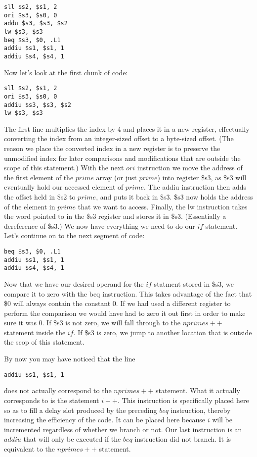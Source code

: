 \documentclass[11pt]{article}
\begin{document}
\begin{verbatim}
sll $s2, $s1, 2
ori $s3, $s0, 0
addu $s3, $s3, $s2
lw $s3, $s3
beq $s3, $0, .L1
addiu $s1, $s1, 1
addiu $s4, $s4, 1
\end{verbatim}

Now let's look at the first chunk of code:

\begin{verbatim}
sll $s2, $s1, 2
ori $s3, $s0, 0
addiu $s3, $s3, $s2
lw $s3, $s3
\end{verbatim}

The first line multiplies the index by 4 and places it in a new register, effectually converting the index from an integer-sized offset to a byte-sized offset. (The reason we place the converted index in a new register is to preserve the unmodified index for later comparisons and modifications that are outside the scope of this statement.) With the next $ori$ instruction we move the address of the first element of the $prime$ array (or just $prime$) into register \$s3, as \$s3 will eventually hold our accessed element of $prime$. The addiu instruction then adds the offset held in \$s2 to $prime$, and puts it back in \$s3. \$s3 now holds the address of the element in $prime$ that we want to access. Finally, the lw instruction takes the word pointed to in the \$s3 register and stores it in \$s3. (Essentially a dereference of \$s3.) We now have everything we need to do our $if$ statement. Let's continue on to the next segment of code:

\begin{verbatim}
beq $s3, $0, .L1
addiu $s1, $s1, 1
addiu $s4, $s4, 1
\end{verbatim}

Now that we have our desired operand for the $if$ statment stored in \$s3, we compare it to zero with the beq instruction. This takes advantage of the fact that \$0 will always contain the constant 0. If we had used a different register to perform the comparison we would have had to zero it out first in order to make sure it was 0. If \$s3 is not zero, we will fall through to the $nprimes++$ statement inside the $if$. If \$s3 is zero, we jump to another location that is outside the scop of this statement. 

By now you may have noticed that the line

\begin{verbatim}
addiu $s1, $s1, 1
\end{verbatim}

does not actually correspond to the $nprimes++$ statement. What it actually corresponds to is the statement $i++$. This instruction is specifically placed here so as to fill a delay slot produced by the preceding $beq$ instruction, thereby increasing the efficiency of the code. It can be placed here because $i$ will be incremented regardless of whether we branch or not. Our last instruction is an $addiu$ that will only be executed if the $beq$ instruction did not branch. It is equivalent to the $nprimes++$ statement.
\end{document}
